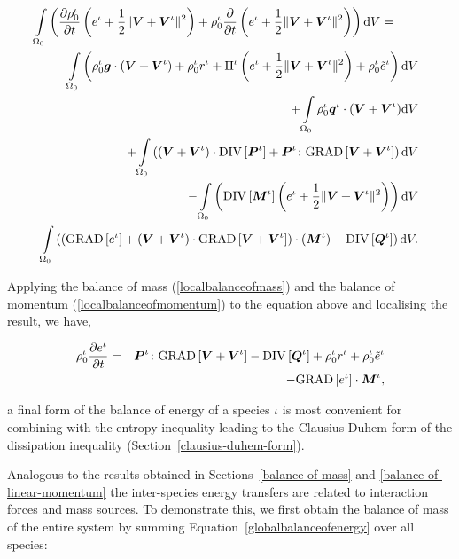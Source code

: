 \begin{eqnarray}
\int\limits_{\Omega_0}\left(\frac{\partial\rho_0^\iota}{\partial t}
\left(e^\iota + \frac{1}{2}\Vert\mbox{\boldmath$ V$}+\mbox{\boldmath$ V$}^\iota\Vert^2 \right) +
\rho^\iota_0\frac{\partial}{\partial t}\left(e^\iota +
\frac{1}{2}\Vert\mbox{\boldmath$ V$}+\mbox{\boldmath$ V$}^\iota\Vert^2 \right)\right) \mathrm{d}V
=\qquad & &\nonumber\\ \int\limits_{\Omega_0} \left(\rho_0^\iota\mbox{\boldmath$ g$}
\cdot\left(\mbox{\boldmath$ V$}+\mbox{\boldmath$ V$}^\iota\right) + \rho_0^\iota r^\iota +
\Pi^\iota\left(e^\iota +
\frac{1}{2}\Vert\mbox{\boldmath$ V$}+\mbox{\boldmath$ V$}^\iota\Vert^2\right) +
\rho^\iota_0\tilde{e}^\iota\right)\mathrm{d}V& 
& \nonumber
\\ +\int\limits_{\Omega_0}\rho_0^\iota\mbox{\boldmath$ q$}^\iota\cdot(\mbox{\boldmath$ V$}+\mbox{\boldmath$ V$}^\iota)
\mathrm{d}V&
&\nonumber\\ +\int\limits_{\Omega_0} \left(\left(\mbox{\boldmath$ V$}+\mbox{\boldmath$ V$}^\iota\right)
\cdot\mathrm{DIV}\left[\mbox{\boldmath$ P$}^\iota\right]
+ \mbox{\boldmath$ P$}^\iota\colon\mathrm{GRAD}
\left[\mbox{\boldmath$ V$}+\mbox{\boldmath$ V$}^\iota\right]\right) \mathrm{d}V& &\nonumber\\ -
\int\limits_{\Omega_0}\left(\mathrm{DIV}\left[\mbox{\boldmath$ M$}^\iota\right]
\left(e^\iota +\frac{1}{2}
\Vert\mbox{\boldmath$ V$}+\mbox{\boldmath$ V$}^\iota\Vert^2\right)\right)\mathrm{d}V & 
&\nonumber\\ -\int\limits_{\Omega_0}\left(
\left(\mathrm{GRAD}\left[e^\iota\right]+
\left(\mbox{\boldmath$ V$}+\mbox{\boldmath$ V$}^\iota\right) \cdot
\mathrm{GRAD}\left[\mbox{\boldmath$ V$}+\mbox{\boldmath$ V$}^\iota\right]\right) \cdot\left(\mbox{\boldmath$ M$}^\iota\right)
- \mathrm{DIV}\left[\mbox{\boldmath$ Q$}^\iota\right]\right)\mathrm{d}V.\nonumber
\end{eqnarray}

\noindent Applying the balance of mass (\ref{localbalanceofmass}) and
the balance of momentum (\ref{localbalanceofmomentum}) to the equation
above and localising the result, we have,

\begin{eqnarray}
\rho^\iota_0\frac{\partial e^\iota}{\partial t} &=&
\mbox{\boldmath$ P$}^\iota\colon\mathrm{GRAD}\left[\mbox{\boldmath$ V$}+\mbox{\boldmath$ V$}^\iota\right]-
\mathrm{DIV}\left[\mbox{\boldmath$ Q$}^\iota\right] + \rho_0^\iota r^\iota
+\rho^\iota_0\tilde{e}^\iota\nonumber\\
& & - \mathrm{GRAD}\left[e^\iota\right]\cdot\mbox{\boldmath$ M$}^\iota,
\label{localbalanceofenergy}
\end{eqnarray}

\noindent a final form of the balance of energy of a species $\iota$
is most convenient for combining with the entropy inequality leading
to the Clausius-Duhem form of the dissipation inequality
(Section~\ref{clausius-duhem-form}).

Analogous to the results obtained in Sections~\ref{balance-of-mass}
and \ref{balance-of-linear-momentum} the inter-species energy
transfers are related to interaction forces and mass sources. To
demonstrate this, we first obtain the balance of mass of the entire
system by summing Equation~\ref{globalbalanceofenergy} over all species:

